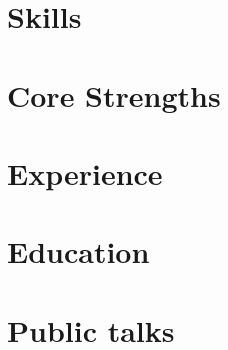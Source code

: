 \documentclass[letter,10pt]{article}
\begin{document}


\section{Skills}


\section{Core Strengths}


\section{Experience}


%

\section{Education}



\section{Public talks}

\end{document}
